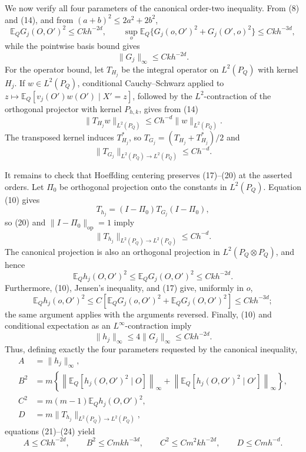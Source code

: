 We now verify all four parameters of the canonical order-two inequality.  From (8) and (14), and from \((a+b)^2\leq2a^2+2b^2\),
\[
 \mathbb E_QG_j(O,O')^2\leq Ckh^{-2d},
 \qquad
 \sup_o\mathbb E_Q\{G_j(o,O')^2+G_j(O',o)^2\}
 \leq Ckh^{-3d},
\tag{17}
\]
while the pointwise basis bound gives
\[
 \|G_j\|_\infty\leq Ckh^{-2d}.
\tag{18}
\]
For the operator bound, let \(T_{H_j}\) be the integral operator on \(L^2(P_Q)\) with kernel \(H_j\).  If \(w\in L^2(P_Q)\), conditional Cauchy--Schwarz applied to
\(z\mapsto\mathbb E_Q[v_j(O')w(O')\mid X'=z]\), followed by the \(L^2\)-contraction of the orthogonal projector with kernel \(P_{h,k}\), gives from (14)
\[
 \|T_{H_j}w\|_{L^2(P_Q)}\leq Ch^{-d}\|w\|_{L^2(P_Q)}.
\tag{19}
\]
The transposed kernel induces \(T_{H_j}^*\), so
\(T_{G_j}=(T_{H_j}+T_{H_j}^*)/2\) and
\[
 \|T_{G_j}\|_{L^2(P_Q)\to L^2(P_Q)}\leq Ch^{-d}.
\tag{20}
\]

It remains to check that Hoeffding centering preserves (17)--(20) at the asserted orders.  Let \(\Pi_0\) be orthogonal projection onto the constants in \(L^2(P_Q)\).  Equation (10) gives
\[
 T_{h_j}=(I-\Pi_0)T_{G_j}(I-\Pi_0),
\]
so (20) and \(\|I-\Pi_0\|_{\mathrm{op}}=1\) imply
\[
 \|T_{h_j}\|_{L^2(P_Q)\to L^2(P_Q)}\leq Ch^{-d}.
\tag{21}
\]
The canonical projection is also an orthogonal projection in \(L^2(P_Q\otimes P_Q)\), and hence
\[
 \mathbb E_Qh_j(O,O')^2\leq\mathbb E_QG_j(O,O')^2\leq Ckh^{-2d}.
\tag{22}
\]
Furthermore, (10), Jensen's inequality, and (17) give, uniformly in \(o\),
\[
 \mathbb E_Qh_j(o,O')^2
 \leq C\left[\mathbb E_QG_j(o,O')^2+\mathbb E_QG_j(O,O')^2\right]
 \leq Ckh^{-3d};
\tag{23}
\]
the same argument applies with the arguments reversed.  Finally, (10) and conditional expectation as an \(L^\infty\)-contraction imply
\[
 \|h_j\|_\infty\leq4\|G_j\|_\infty\leq Ckh^{-2d}.
\tag{24}
\]
Thus, defining exactly the four parameters requested by the canonical inequality,
\[
 \begin{aligned}
 A&=\|h_j\|_\infty,\\
 B^2&=m\left\{\left\|\mathbb E_Q[h_j(O,O')^2\mid O]\right\|_\infty
               +\left\|\mathbb E_Q[h_j(O,O')^2\mid O']\right\|_\infty\right\},\\
 C^2&=m(m-1)\mathbb E_Qh_j(O,O')^2,\\
 D&=m\|T_{h_j}\|_{L^2(P_Q)\to L^2(P_Q)},
 \end{aligned}
\tag{25}
\]
equations (21)--(24) yield
\[
 A\leq Ckh^{-2d},\qquad
 B^2\leq Cmkh^{-3d},\qquad
 C^2\leq Cm^2kh^{-2d},\qquad
 D\leq Cmh^{-d}.
\tag{26}
\]

